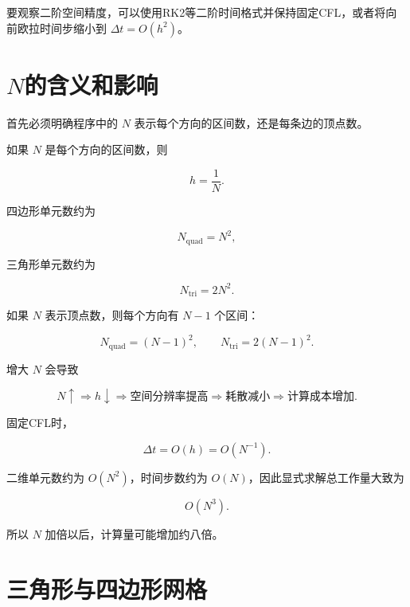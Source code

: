 \documentclass[UTF8,12pt,a4paper,fontset=fandol]{ctexart}
\begin{document}
要观察二阶空间精度，可以使用RK2等二阶时间格式并保持固定CFL，或者将向前欧拉时间步缩小到 $\Delta t=O(h^2)$。

\section{\texorpdfstring{$N$}{N}的含义和影响}

首先必须明确程序中的 $N$ 表示每个方向的区间数，还是每条边的顶点数。

如果 $N$ 是每个方向的区间数，则

\begin{equation}
h=\frac1N.
\end{equation}

四边形单元数约为

\begin{equation}
N_{\mathrm{quad}}=N^2,
\end{equation}

三角形单元数约为

\begin{equation}
N_{\mathrm{tri}}=2N^2.
\end{equation}

如果 $N$ 表示顶点数，则每个方向有 $N-1$ 个区间：

\begin{equation}
N_{\mathrm{quad}}=(N-1)^2,
\qquad
N_{\mathrm{tri}}=2(N-1)^2.
\end{equation}

增大 $N$ 会导致

\begin{equation}
N\uparrow
\Longrightarrow
h\downarrow
\Longrightarrow
\text{空间分辨率提高}
\Longrightarrow
\text{耗散减小}
\Longrightarrow
\text{计算成本增加}.
\end{equation}

固定CFL时，

\begin{equation}
\Delta t=O(h)=O(N^{-1}).
\end{equation}

二维单元数约为 $O(N^2)$，时间步数约为 $O(N)$，因此显式求解总工作量大致为

\begin{equation}
O(N^3).
\end{equation}

所以 $N$ 加倍以后，计算量可能增加约八倍。

\section{三角形与四边形网格}
\end{document}

